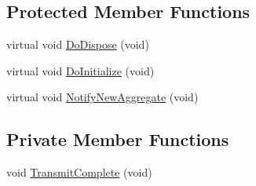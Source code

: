 \subsection*{Protected Member Functions}
\begin{DoxyCompactItemize}
\item 
virtual void \hyperlink{classns3_1_1SimpleNetDevice_ae58a759464c2ceb52247b08a6a8ea5c6}{Do\+Dispose} (void)
\item 
virtual void \hyperlink{classns3_1_1SimpleNetDevice_ab8f09c559877b0568e793755b176a83c}{Do\+Initialize} (void)
\item 
virtual void \hyperlink{classns3_1_1SimpleNetDevice_a956746ef9cede86e9fda72fa85770dd2}{Notify\+New\+Aggregate} (void)
\end{DoxyCompactItemize}
\subsection*{Private Member Functions}
\begin{DoxyCompactItemize}
\item 
void \hyperlink{classns3_1_1SimpleNetDevice_aa889ff3b3b3d94d9784f4984309bca4c}{Transmit\+Complete} (void)
\end{DoxyCompactItemize}

